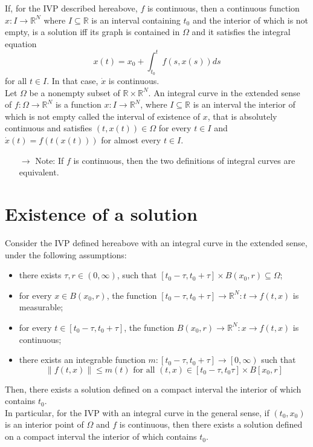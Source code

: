 \documentclass[12pt, openany]{report}
\theoremstyle{definition}
\newcommand{\R}{\mathbb{R}}
\begin{document}
If, for the IVP described hereabove, \(f\) is continuous, then a continuous function \(x:I\rightarrow \R^N\) where \(I\subseteq \R\) is an interval containing \(t_0\) and the interior of which is not empty, is a solution iff its graph is contained in \(\Omega\) and it satisfies the integral equation \[x(t)=x_0+\int_{t_0}^tf(s,x(s))ds\] for all \(t\in I\). In that case, \(\dot x\) is continuous. \\

Let \(\Omega\) be a nonempty subset of \(\R\times \R^N\). An integral curve in the extended sense of \(f:\Omega\rightarrow \R^N\) is a function \(x:I\rightarrow \R^N\), where \(I\subseteq \R\) is an interval the interior of which is not empty called the interval of existence of \(x\), that is absolutely continuous and satisfies \((t,x(t))\in \Omega\) for every \(t\in I\) and \(\dot x(t) = f(t(x(t)))\) for almost every \(t\in I\). 
\begin{itemize}
    \item [\(\rightarrow\)] Note: If \(f\) is continuous, then the two definitions of integral curves are equivalent.
\end{itemize}
\section{Existence of a solution}
Consider the IVP defined hereabove with an integral curve in the extended sense, under the following assumptions:
\begin{itemize}
    \item there exists \(\tau,r\in (0,\infty)\), such that \([t_0-\tau,t_0+\tau]\times B(x_0,r)\subseteq \Omega\);
    \item for every \(x\in B(x_0,r)\), the function \([t_0-\tau,t_0+\tau]\rightarrow \R^N:t\rightarrow f(t,x)\) is measurable;
    \item for every \(t\in [t_0-\tau,t_0+\tau]\), the function \(B(x_0,r)\rightarrow \R^N:x\rightarrow f(t,x)\) is continuous;
    \item there exists an integrable function \(m:[t_0-\tau,t_0+\tau]\rightarrow \left[0,\infty\right)\) such that \[\lVert f(t,x)\rVert \le m(t) \text{ for all }(t,x) \in [t_0-\tau,t_0\tau]\times B[x_0,r]\]
\end{itemize}
Then, there exists a solution defined on a compact interval the interior of which contains \(t_0\). \\
In particular, for the IVP with an integral curve in the general sense, if \((t_0,x_0)\) is an interior point of \(\Omega\) and \(f\) is continuous, then there exists a solution defined on a compact interval the interior of which contains \(t_0\).
\end{document}
